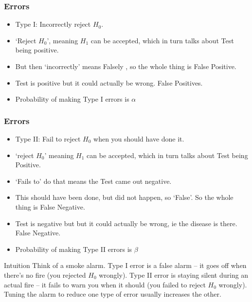 \begin{frame}[fragile]\frametitle{Errors}
\begin{itemize}
\item Type I: Incorrectly reject $H_0$. 
\item `Reject $H_0$', meaning $H_1$ can be accepted, which in turn talks about Test being positive.
\item But then `incorrectly' means Falsely , so the whole thing is False Positive.
\item Test is positive but it could actually be wrong. False Positives.
\item Probability of making Type I errors is $\alpha$
\end{itemize}
\end{frame}

\begin{frame}[fragile]\frametitle{Errors}
\begin{itemize}
\item Type II: Fail to reject $H_0$ when you should have done it. 
\item `reject $H_0$' meaning $H_1$ can be accepted, which in turn talks about Test being Positive.
\item `Fails to' do that means the Test came out negative. 
\item This should have been done, but did not happen, so `False'. So the whole thing is False Negative.
\item Test is negative but but it could actually be wrong, ie the disease is there. False Negative.
\item Probability of making Type II errors is $\beta$
\end{itemize}

\begin{block}{Intuition}
Think of a smoke alarm. Type I error is a false alarm -- it goes off when there's no fire (you rejected $H_0$ wrongly). Type II error is staying silent during an actual fire -- it fails to warn you when it should (you failed to reject $H_0$ wrongly). Tuning the alarm to reduce one type of error usually increases the other.
\end{block}
\end{frame}



